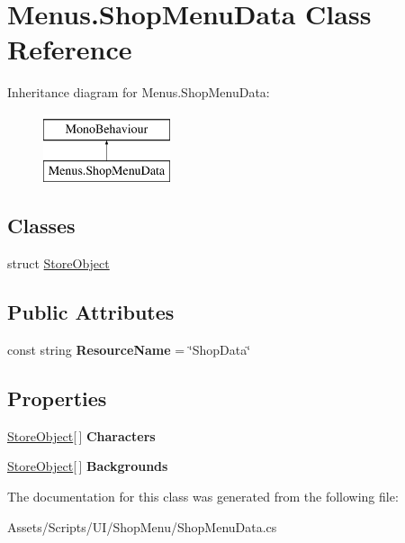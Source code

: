 \hypertarget{class_menus_1_1_shop_menu_data}{}\section{Menus.\+Shop\+Menu\+Data Class Reference}
\label{class_menus_1_1_shop_menu_data}
Inheritance diagram for Menus.\+Shop\+Menu\+Data\+:\begin{figure}[H]
\begin{center}
\leavevmode
\includegraphics[height=2.000000cm]{class_menus_1_1_shop_menu_data}
\end{center}
\end{figure}
\subsection*{Classes}
\begin{DoxyCompactItemize}
\item 
struct \hyperlink{struct_menus_1_1_shop_menu_data_1_1_store_object}{Store\+Object}
\end{DoxyCompactItemize}
\subsection*{Public Attributes}
\begin{DoxyCompactItemize}
\item 
const string {\bfseries Resource\+Name} = \char`\"{}Shop\+Data\char`\"{}\hypertarget{class_menus_1_1_shop_menu_data_a0f1c9a23c1e5da1011eacc742121334a}{}\label{class_menus_1_1_shop_menu_data_a0f1c9a23c1e5da1011eacc742121334a}

\end{DoxyCompactItemize}
\subsection*{Properties}
\begin{DoxyCompactItemize}
\item 
\hyperlink{struct_menus_1_1_shop_menu_data_1_1_store_object}{Store\+Object}\mbox{[}$\,$\mbox{]} {\bfseries Characters}\hypertarget{class_menus_1_1_shop_menu_data_abbc6902ebe3cb79170943783e5a25415}{}\label{class_menus_1_1_shop_menu_data_abbc6902ebe3cb79170943783e5a25415}

\item 
\hyperlink{struct_menus_1_1_shop_menu_data_1_1_store_object}{Store\+Object}\mbox{[}$\,$\mbox{]} {\bfseries Backgrounds}\hypertarget{class_menus_1_1_shop_menu_data_a7736493b49a50ab592f5772933fa0ce9}{}\label{class_menus_1_1_shop_menu_data_a7736493b49a50ab592f5772933fa0ce9}

\end{DoxyCompactItemize}


The documentation for this class was generated from the following file\+:\begin{DoxyCompactItemize}
\item 
Assets/\+Scripts/\+U\+I/\+Shop\+Menu/Shop\+Menu\+Data.\+cs\end{DoxyCompactItemize}
